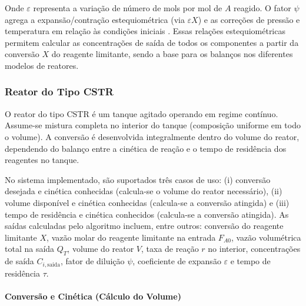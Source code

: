Onde $\varepsilon$ representa a variação de número de mols por mol de $A$ reagido. O fator $\psi$ agrega a expansão/contração estequiométrica (via $\varepsilon X$) e as correções de pressão e temperatura em relação às condições iniciais \cite{levenspiel2000}. Essas relações estequiométricas permitem calcular as concentrações de saída de todos os componentes a partir da conversão $X$ do reagente limitante, sendo a base para os balanços nos diferentes modelos de reatores.

\subsubsection{Reator do Tipo CSTR}

O reator do tipo CSTR é um tanque agitado operando em regime contínuo. Assume-se mistura completa no interior do tanque (composição uniforme em todo o volume). A conversão é desenvolvida integralmente dentro do volume do reator, dependendo do balanço entre a cinética de reação e o tempo de residência dos reagentes no tanque.

No sistema implementado, são suportados três casos de uso: (i) conversão desejada e cinética conhecidas (calcula-se o volume do reator necessário), (ii) volume disponível e cinética conhecidas (calcula-se a conversão atingida) e (iii) tempo de residência e cinética conhecidos (calcula-se a conversão atingida). As saídas calculadas pelo algoritmo incluem, entre outros: conversão do reagente limitante $X$, vazão molar do reagente limitante na entrada $F_{A0}$, vazão volumétrica total na saída $Q_{T}$, volume do reator $V$, taxa de reação $r$ no interior, concentrações de saída $C_{i,\mathrm{saida}}$, fator de diluição $\psi$, coeficiente de expansão $\varepsilon$ e tempo de residência $\tau$.

\paragraph{Conversão e Cinética (Cálculo do Volume)}

